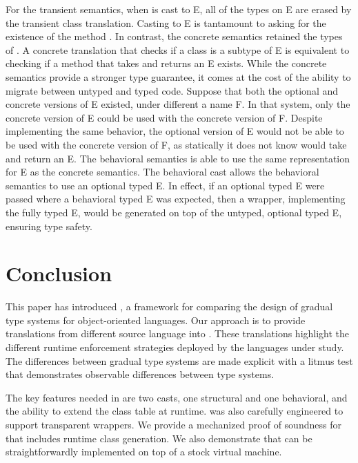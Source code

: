 \documentclass[a4paper,USenglish]{tex/lipics-v2016}
\begin{document}
For the transient semantics, when \x is cast to {\xt E}, all of the types on
{\xt E} are erased by the transient class translation. Casting to {\xt E} is
tantamount to asking for the existence of the method \m. In contrast, the
concrete semantics retained the types of \m. A concrete translation that
checks if a class is a subtype of {\xt E} is equivalent to checking if a
method \m that takes and returns an {\xt E} exists.  While the concrete
semantics provide a stronger type guarantee, it comes at the cost of the
ability to migrate between untyped and typed code. Suppose that both the
optional and concrete versions of {\xt E} existed, under different a name
{\xt F}. In that system, only the concrete version of {\xt E} could be used
with the concrete version of {\xt F}. Despite implementing the same
behavior, the optional version of {\xt E} would not be able to be used with
the concrete version of {\xt F}, as statically it does not know \m would
take and return an {\xt E}.  The behavioral semantics is able to use the
same representation for {\xt E} as the concrete semantics. The behavioral
cast allows the behavioral semantics to use an optional typed {\xt E}. In
effect, if an optional typed {\xt E} were passed where a behavioral typed
{\xt E} was expected, then a wrapper, implementing the fully typed {\xt E},
would be generated on top of the untyped, optional typed {\xt E}, ensuring
type safety.

\section{Conclusion}\label{litm}

This paper has introduced \kafka, a framework for comparing the design of
gradual type systems for object-oriented languages. Our approach is to
provide translations from different source language into \kafka. These
translations highlight the different runtime enforcement strategies deployed
by the languages under study. The differences between gradual type systems
are made explicit with a litmus test that demonstrates observable
differences between type systems. 

The key features needed in \kafka are two casts, one structural and one
behavioral, and the ability to extend the class table at runtime.  \kafka
was also carefully engineered to support transparent wrappers.  We provide a
mechanized proof of soundness for \kafka that includes runtime class
generation.  We also demonstrate that \kafka can be straightforwardly
implemented on top of a stock virtual machine.
\end{document}
